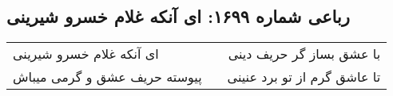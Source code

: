 \begin{center}
\section*{رباعی شماره ۱۶۹۹: ای آنکه غلام خسرو شیرینی}
\label{sec:1699}
\begin{longtable}{l p{0.5cm} r}
ای آنکه غلام خسرو شیرینی
&&
با عشق بساز گر حریف دینی
\\
پیوسته حریف عشق و گرمی میباش
&&
تا عاشق گرم از تو برد عنینی
\\
\end{longtable}
\end{center}
